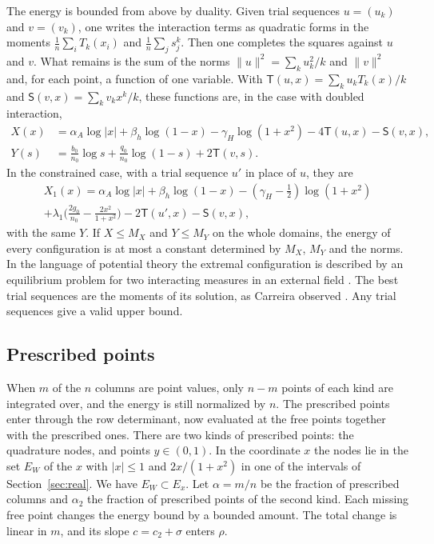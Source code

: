 \documentclass[11pt]{amsart}
\theoremstyle{definition}
\theoremstyle{remark}
\numberwithin{equation}{section}
\begin{document}
The energy is bounded from above by duality. Given trial sequences $u=(u_k)$ and $v=(v_k)$, one writes the
interaction terms as quadratic forms in the moments $\frac1n\sum_iT_k(x_i)$ and $\frac1n\sum_js_j^k$. Then one
completes the squares against $u$ and $v$. What remains is the sum of the norms $\|u\|^2=\sum_ku_k^2/k$ and
$\|v\|^2$ and, for each point, a function of one variable. With $\mathsf T(u,x)=\sum_ku_kT_k(x)/k$ and
$\mathsf S(v,x)=\sum_kv_kx^k/k$, these functions are, in the case with doubled interaction,
\begin{align*}
 X(x)&=\alpha_A\log|x|+\beta_h\log(1-x)-\gamma_H\log(1+x^2)-4\mathsf T(u,x)-\mathsf S(v,x),\\
 Y(s)&=\tfrac{b_0}{n_0}\log s+\tfrac{q_0}{n_0}\log(1-s)+2\mathsf T(v,s).
\end{align*}
In the constrained case, with a trial sequence $u'$ in place of $u$, they are
\begin{multline*}
 X_1(x)=\alpha_A\log|x|+\beta_h\log(1-x)-(\gamma_H-\tfrac12)\log(1+x^2)\\
 +\lambda_1\bigl(\tfrac{2g_0}{n_0}-\tfrac{2x^2}{1+x^2}\bigr)-2\mathsf T(u',x)-\mathsf S(v,x),
\end{multline*}
with the same $Y$. If $X\le M_X$ and $Y\le M_Y$ on the whole domains, the energy of every configuration is at
most a constant determined by $M_X$, $M_Y$ and the norms. In the language of potential theory the extremal
configuration is described by an equilibrium problem for two interacting measures in an external field
\cite{SaffTotik}. The best trial sequences are the moments of its solution, as Carreira observed
\cite{Carreira2026}. Any trial sequences give a valid upper bound.

\subsection{Prescribed points}\label{ssec:prescribed}
When $m$ of the $n$ columns are point values, only $n-m$ points of each kind are integrated over, and the
energy is still normalized by $n$. The prescribed points enter through the row determinant, now evaluated
at the free points together with the prescribed ones. There are two kinds of prescribed points: the
quadrature nodes, and points $y\in(0,1)$. In the coordinate $x$ the nodes lie in the set $E_W$ of the $x$ with
$|x|\le1$ and $2x/(1+x^2)$ in one of the intervals of Section~\ref{sec:real}. We have $E_W\subset E_x$. Let
$\alpha=m/n$ be the fraction of prescribed columns and $\alpha_2$ the fraction of prescribed points of the
second kind. Each missing free point changes the energy bound by a bounded amount. The total change is linear
in $m$, and its slope $c=c_2+\sigma$ enters $\rho$.
\end{document}
